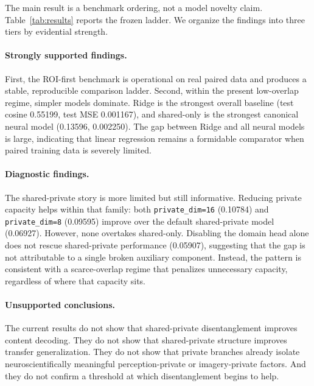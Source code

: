 \documentclass{article}
\begin{document}
The main result is a benchmark ordering, not a model novelty claim.
Table~\ref{tab:results} reports the frozen ladder.  We organize the findings
into three tiers by evidential strength.

\paragraph{Strongly supported findings.}
First, the ROI-first benchmark is operational on real paired data and produces a
stable, reproducible comparison ladder.  Second, within the present low-overlap
regime, simpler models dominate.  Ridge is the strongest overall baseline (test
cosine 0.55199, test MSE 0.001167), and shared-only is the strongest canonical
neural model (0.13596, 0.002250).  The gap between Ridge and all neural models
is large, indicating that linear regression remains a formidable comparator when
paired training data is severely limited.

\paragraph{Diagnostic findings.}
The shared-private story is more limited but still informative.  Reducing
private capacity helps within that family: both \texttt{private\_dim=16}
(0.10784) and \texttt{private\_dim=8} (0.09595) improve over the default
shared-private model (0.06927).  However, none overtakes shared-only.  Disabling
the domain head alone does not rescue shared-private performance (0.05907),
suggesting that the gap is not attributable to a single broken auxiliary
component.  Instead, the pattern is consistent with a scarce-overlap regime that
penalizes unnecessary capacity, regardless of where that capacity sits.

\paragraph{Unsupported conclusions.}
The current results do not show that shared-private disentanglement improves
content decoding.  They do not show that shared-private structure improves
transfer generalization.  They do not show that private branches already isolate
neuroscientifically meaningful perception-private or imagery-private factors.
And they do not confirm a threshold at which disentanglement begins to help.
\end{document}
